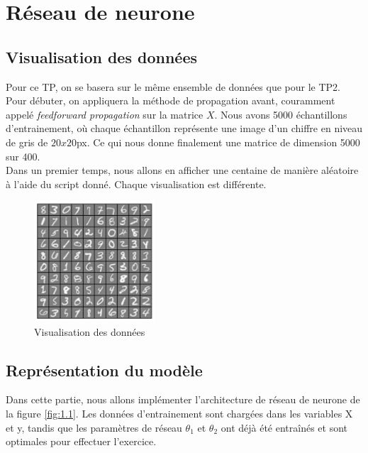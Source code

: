\section{Réseau de neurone}

\subsection{Visualisation des données}

Pour ce TP, on se basera sur le même ensemble de données que pour le TP2. Pour débuter, on appliquera la méthode de propagation avant, couramment appelé \textit{feedforward propagation} sur la matrice $X$. Nous avons 5000 échantillons d'entrainement, où chaque échantillon représente une image d'un chiffre en niveau de gris de $20x20$px. Ce qui nous donne finalement une matrice de dimension 
5000 sur 400. \\
Dans un premier temps, nous allons en afficher une centaine de manière aléatoire à l'aide du script donné. Chaque visualisation est différente.

\begin{figure}[!h]
    \begin{center}
        \includegraphics[width=0.4\textwidth]{./img/1.2.png}
        \caption{\label{fig:1.2}Visualisation des données}  
    \end{center}
\end{figure}



\clearpage

\subsection{Représentation du modèle}

Dans cette partie, nous allons implémenter l'architecture de réseau de neurone de la figure \ref{fig:1.1}. 
Les données d'entrainement sont chargées dans les variables X et y, tandis que les paramètres de réseau $\theta_1$ 
et $\theta_2$ ont déjà été entraînés et sont optimales pour effectuer l'exercice.

